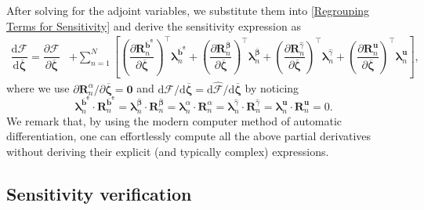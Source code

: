 \documentclass[preprint,11pt]{elsarticle}
\theoremstyle{definition}
\begin{document}
After solving for the adjoint variables, we substitute them into \eqref{Regrouping Terms for Sensitivity} and derive the sensitivity expression as
\begin{equation*}
    \begin{array}{ll}
        \dfrac{\text{d} \mathcal{F}}{\text{d} \overline{\boldsymbol{\zeta}}}
        = \dfrac{\partial \mathcal{F}}{\partial \overline{\boldsymbol{\zeta}}}
        &+ \displaystyle \sum_{n=1}^N \left[ \left( \dfrac{\partial \mathbf{R}_n^{\overline{\mathbf{b}}^\texttt{e}}}{\partial \overline{\boldsymbol{\zeta}}} \right)^\top \boldsymbol{\lambda}_n^{\overline{\mathbf{b}}^\texttt{e}}
        + \left( \dfrac{\partial \mathbf{R}_n^{\overline{\boldsymbol{\beta}}}}{\partial \overline{\boldsymbol{\zeta}}} \right)^\top \boldsymbol{\lambda}_n^{\overline{\boldsymbol{\beta}}}
        + \left( \dfrac{\partial \mathbf{R}_n^{\widehat{\gamma}}}{\partial \overline{\boldsymbol{\zeta}}} \right)^\top  \boldsymbol{\lambda}_n^{\widehat{\gamma}}
        + \left( \dfrac{\partial \mathbf{R}_n^\mathbf{u}}{\partial \overline{\boldsymbol{\zeta}}} \right)^\top \boldsymbol{\lambda}_n^\mathbf{u} \right],
    \end{array}
\end{equation*}
where we use $\partial \mathbf{R}_n^\alpha / \partial \overline{\boldsymbol{\zeta}} = \mathbf{0}$ and $\text{d} \mathcal{F}/\text{d} \overline{\boldsymbol{\zeta}} = \text{d} \widehat{\mathcal{F}}/\text{d} \overline{\boldsymbol{\zeta}}$ by noticing 
\begin{equation} \label{Sensitivity Expression}
    \boldsymbol{\lambda}_n^{\overline{\mathbf{b}}^\texttt{e}} \cdot \mathbf{R}_n^{\overline{\mathbf{b}}^\texttt{e}}
    = \boldsymbol{\lambda}_n^{\overline{\boldsymbol{\beta}}} \cdot \mathbf{R}_n^{\overline{\boldsymbol{\beta}}}
    = \boldsymbol{\lambda}_n^\alpha \cdot \mathbf{R}_n^\alpha
    = \boldsymbol{\lambda}_n^{\widehat{\gamma}} \cdot \mathbf{R}_n^{\widehat{\gamma}}
    = \boldsymbol{\lambda}_n^\mathbf{u} \cdot \mathbf{R}_n^\mathbf{u} = 0.
\end{equation}
We remark that, by using the modern computer method of automatic differentiation, one can effortlessly compute all the above partial derivatives without deriving their explicit (and typically complex) expressions.

\subsection{Sensitivity verification}
\end{document}
